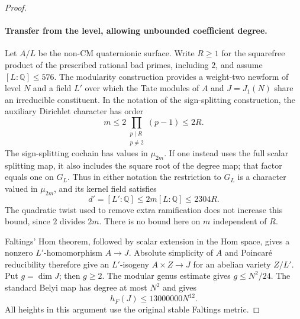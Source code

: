 \documentclass[11pt]{article}
\theoremstyle{definition}
\theoremstyle{remark}
\begin{document}
\begin{proof}
\paragraph{Transfer from the level, allowing unbounded coefficient degree.}
Let $A/L$ be the non-CM quaternionic surface. Write $R\geq1$ for the
squarefree product of the prescribed rational bad primes, including $2$,
and assume $[L:\mathbb Q]\leq576$. The modularity construction provides
a weight-two newform of level $N$ and a field $L'$ over which the Tate
modules of $A$ and $J=J_1(N)$ share an irreducible constituent. In the
notation of the sign-splitting construction, the auxiliary Dirichlet
character has order
\[
 m\leq 2\prod_{\substack{p\mid R\\p\ne2}}(p-1)\leq2R.
\]
The sign-splitting cochain has values in $\mu_{2m}$. If one instead
uses the full scalar splitting map, it also includes the square root
of the degree map; that factor equals one on $G_L$. Thus in either
notation the restriction to $G_L$ is a character valued in
$\mu_{2m}$, and its kernel field satisfies
\[
 d'=[L':\mathbb Q]\leq2m[L:\mathbb Q]\leq2304R.
\tag{LT1}
\]
The quadratic twist used to remove extra ramification does not increase
this bound, since $2$ divides $2m$. There is no bound here on $m$
independent of $R$.

Faltings' Hom theorem, followed by scalar extension in the Hom space,
gives a nonzero $L'$-homomorphism $A\to J$. Absolute simplicity of $A$
and Poincar\'e reducibility therefore give an $L'$-isogeny
$A\times Z\to J$ for an abelian variety $Z/L'$. Put $g=\dim J$;
then $g\geq2$. The modular genus estimate
\cite[(5.9), p.~13]{vonKaenel2021} gives $g\leq N^2/24$.
The standard Belyi map has degree at most $N^2$ and
\cite[Theorem~1.1.1 and \S2.3]{javanpeykar} gives
\[
 h_F(J)\leq13000000N^{12}.
\tag{LT2}
\]
All heights in this argument use the original stable Faltings metric.


\end{proof}
\end{document}
